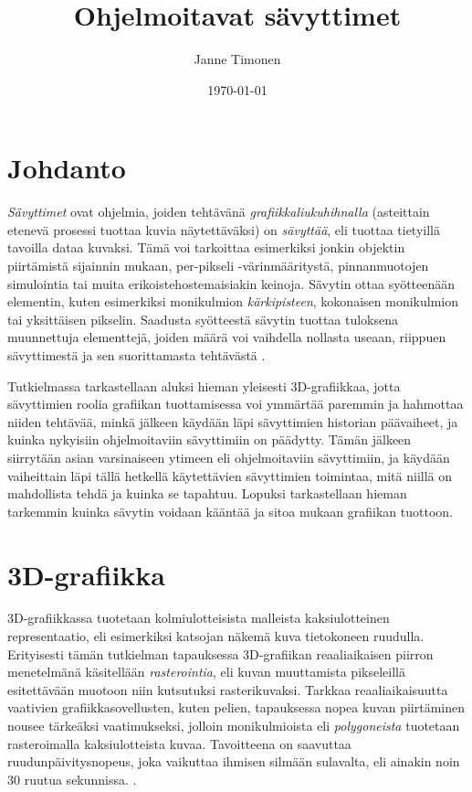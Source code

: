 \documentclass[finnish]{tktltiki2}
\title{Ohjelmoitavat sävyttimet}
\author{Janne Timonen}
\date{\today}
\theoremstyle{definition}
\theoremstyle{remark}
\begin{document}

\frontmatter      %

\maketitle        %
\makeabstract     %

\tableofcontents  %


\mainmatter       %

\section{Johdanto}


\emph{Sävyttimet} ovat ohjelmia, joiden tehtävänä \emph{grafiikkaliukuhihnalla} (asteittain etenevä prosessi tuottaa kuvia näytettäväksi) on \emph{sävyttää}, eli tuottaa tietyillä tavoilla dataa kuvaksi. Tämä voi tarkoittaa esimerkiksi jonkin objektin piirtämistä sijainnin mukaan, per-pikseli -värinmääritystä, pinnanmuotojen simulointia tai muita erikoistehostemaisiakin keinoja. Sävytin ottaa syötteenään elementin, kuten esimerkiksi monikulmion \emph{kärkipisteen}, kokonaisen monikulmion tai yksittäisen pikselin. Saadusta syötteestä sävytin tuottaa tuloksena muunnettuja elementtejä, joiden määrä voi vaihdella nollasta useaan, riippuen sävyttimestä ja sen suorittamasta tehtävästä \cite[s. 500]{Gre14}.

Tutkielmassa tarkastellaan aluksi hieman yleisesti 3D-grafiikkaa, jotta sävyttimien roolia grafiikan tuottamisessa voi ymmärtää paremmin ja hahmottaa niiden tehtävää, minkä jälkeen käydään läpi sävyttimien historian päävaiheet, ja kuinka nykyisiin ohjelmoitaviin sävyttimiin on päädytty. Tämän jälkeen siirrytään asian varsinaiseen ytimeen eli ohjelmoitaviin sävyttimiin, ja käydään vaiheittain läpi tällä hetkellä käytettävien sävyttimien toimintaa, mitä niillä on mahdollista tehdä ja kuinka se tapahtuu. Lopuksi tarkastellaan hieman tarkemmin kuinka sävytin voidaan kääntää ja sitoa mukaan grafiikan tuottoon.

\section{3D-grafiikka}

3D-grafiikkassa tuotetaan kolmiulotteisista malleista kaksiulotteinen representaatio, eli esimerkiksi katsojan näkemä kuva tietokoneen ruudulla. Erityisesti tämän tutkielman tapauksessa 3D-grafiikan reaaliaikaisen piirron menetelmänä käsitellään \emph{rasterointia}, eli kuvan muuttamista pikseleillä esitettävään muotoon niin kutsutuksi rasterikuvaksi. Tarkkaa reaaliaikaisuutta vaativien grafiikkasovellusten, kuten pelien, tapauksessa nopea kuvan piirtäminen nousee tärkeäksi vaatimukseksi, jolloin monikulmioista eli \emph{polygoneista} tuotetaan rasteroimalla kaksiulotteista kuvaa. Tavoitteena on saavuttaa ruudunpäivitysnopeus, joka vaikuttaa ihmisen silmään sulavalta, eli ainakin noin 30 ruutua sekunnissa. \cite[s. 444-445]{Gre14}. 
\end{document}
